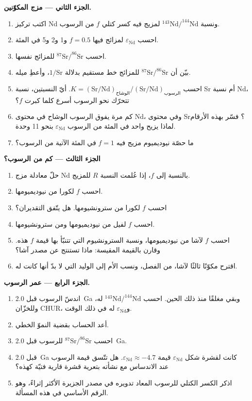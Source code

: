 \begin{problem}
\noindent\textbf{الجزء الثاني --- مزج المكوّنين.}
\begin{enumerate}[resume]
\item اكتب تركيز Nd ونسبة $^{143}\mathrm{Nd}/^{144}\mathrm{Nd}$ لمزيج
فيه كسر كتلي $f$ من الرسوب.
\item احسب $\varepsilon_{\mathrm{Nd}}$ لمزائج فيها $f = 0.5$ و1 و2 و5 في
المئة.
\item احسب $^{87}\mathrm{Sr}/^{86}\mathrm{Sr}$ للمزائج نفسها.
\item بيّن أن $^{87}\mathrm{Sr}/^{86}\mathrm{Sr}$ للمزائج خط مستقيم
بدلالة $1/\mathrm{Sr}$، وأعطِ ميله.
\item احسب $K = (\mathrm{Sr}/\mathrm{Nd})_{\text{الوشاح}}/(\mathrm{Sr}/\mathrm{Nd})_{\text{الرسوب}}$.
أيّ النسبتين، نسبة Sr أم نسبة Nd، تتحرّك نحو الرسوب أسرع كلما كبرت $f$؟
\item كم مرة يفوق الرسوب الوشاح في محتوى Nd، وفي محتوى Sr؟
فسّر بهذه الأرقام لماذا يزيح واحد في المئة من الرسوب
$\varepsilon_{\mathrm{Nd}}$ بنحو 11 وحدة.
\item ما حصّة نيوديميوم مزيج فيه $f = 1$ في المئة الآتية من
الرسوب؟
\end{enumerate}

\noindent\textbf{الجزء الثالث --- كم من الرسوب؟}
\begin{enumerate}[resume]
\item حلّ معادلة مزج Nd بالنسبة إلى $f$، إذا عُلمت النسبة $R$ للمزيج.
\item احسب $f$ لكورا من نيوديميومها.
\item احسب $f$ لكورا من سترونشيومها. هل يتّفق التقديران؟
\item احسب $f$ لفيل من نيوديميومها ومن سترونشيومها.
\item احسب $f$ لآشا من نيوديميومها، ونسبة السترونشيوم التي تتنبّأ بها
قيمة $f$ هذه. وقارن بالقيمة المقيسة: ماذا تستنتج عن مصدر
آشا؟
\item اقترح مكوّنًا ثالثًا لآشا، من الفصل، ونسب
الأم إلى الوليد التي لا بدّ أنها كانت له.
\end{enumerate}

\noindent\textbf{الجزء الرابع --- عمر الرسوب.}
\begin{enumerate}[resume]
\item اندسّ الرسوب قبل \qty{2.0}{Ga} وبقي مغلقًا منذ ذلك الحين.
احسب $^{143}\mathrm{Nd}/^{144}\mathrm{Nd}$ له، وللخزّان CHUR،
و$\varepsilon_{\mathrm{Nd}}$ له في ذلك الوقت.
\item أعد الحساب بقضية النموّ الخطي.
\item احسب $^{87}\mathrm{Sr}/^{86}\mathrm{Sr}$ للرسوب قبل \qty{2.0}{Ga}.
\item قبل \qty{2.0}{Ga} كانت لقشرة شكل $\varepsilon_{\mathrm{Nd}}$ قيمة
$\varepsilon_{\mathrm{Nd}} \approx -4.7$. هل تتّسق قيمة الرسوب عند الاندساس
مع نشأته بتعرية قشرة قارية فتيّة كهذه؟
\item اذكر الكسر الكتلي للرسوب المعاد تدويره في مصدر الجزيرة الأكثر
إثراءً، وهو الرقم الأساسي في هذه المسألة.
\end{enumerate}
\end{problem}
